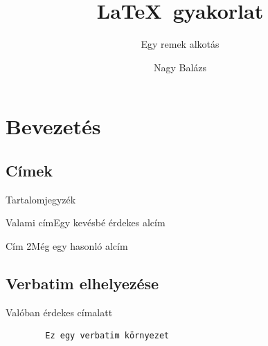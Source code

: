 \documentclass[aspectratio=169,12pt]{beamer}
\author{Nagy Balázs}
\title{\LaTeX\ gyakorlat}
\subtitle{Egy remek alkotás}
\institute{Miskolci Egyetem Gépészmérnöki és Informatikai kara}
\begin{document}
\section{Bevezetés}
\subsection{Címek}
\begin{frame}[plain]
	\maketitle
\end{frame}

\begin{frame}
	\sectionpage
\end{frame}
\begin{frame}[plain]{Tartalomjegyzék}
	\tableofcontents[currentsection]
\end{frame}

\begin{frame}{Valami cím}{Egy kevésbé érdekes alcím}
	\hulipsum[1]
\end{frame}

\begin{frame}[allowframebreaks]{Cím 2}{Még egy hasonló alcím}
	\hulipsum
\end{frame}

\subsection{Verbatim elhelyezése}
\begin{frame}[fragile]{Valóban érdekes cím}{alatt}
	\hulipsum[1]
	\begin{verbatim}
		Ez egy verbatim környezet
	\end{verbatim}
\end{frame}
\end{document}
